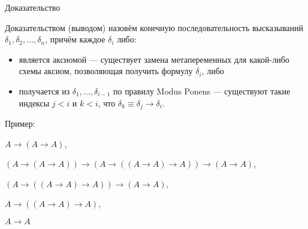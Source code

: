 \documentclass[aspectratio=169]{beamer}
\begin{document}
\begin{frame}{Доказательство}
\begin{defrus}
Доказательством (выводом) назовём конечную последовательность высказываний $\delta_1, \delta_2, \dots, \delta_n$, \pause
причём каждое $\delta_i$ либо:
\begin{itemize}
\item является аксиомой --- существует замена метапеременных для какой-либо схемы аксиом, позволяющая получить
формулу $\delta_i$, либо\pause
\item получается из $\delta_1,\dots,\delta_{i-1}$ по правилу Modus Ponens --- существуют такие индексы $j < i$ и $k < i$,
что $\delta_k \equiv \delta_j\rightarrow\delta_i$.
\end{itemize}\end{defrus}\pause

Пример:\vspace{0.3cm}

$A \rightarrow (A \rightarrow A)$,

$(A \rightarrow (A \rightarrow A)) \rightarrow 
  (A \rightarrow ((A \rightarrow A) \rightarrow A)) \rightarrow
  (A \rightarrow A)$,

$(A \rightarrow ((A \rightarrow A) \rightarrow A)) \rightarrow
  (A \rightarrow A)$,

$A \rightarrow ((A \rightarrow A) \rightarrow A)$,

$A \rightarrow A$\end{frame}
\end{document}

